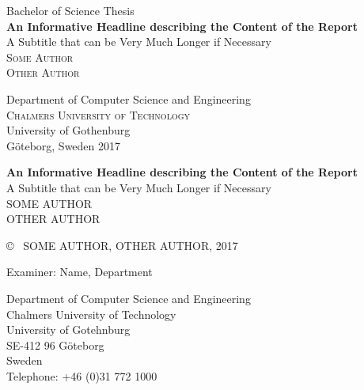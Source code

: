 \newpage
\setcounter{page}{1}
\thispagestyle{empty}
\begin{center}
	\large Bachelor of Science Thesis\\[4cm]		%
	\textbf{\large An Informative Headline describing the Content of the Report} \\[0.7cm]
	{\large A Subtitle that can be Very Much Longer if Necessary}\\[1cm]
	\textsc{{\large Some Author}}\\
	\textsc{{\large Other Author}}\
	
	\vfill	
	\begin{figure}[H]
	\centering
	\end{figure}	\vspace{5mm}	
	
	Department of Computer Science and Engineering \\
	\textsc{Chalmers University of Technology} \\
	University of Gothenburg \\[0.5cm]
	Göteborg, Sweden 2017 \\
\end{center}


\newpage
\thispagestyle{plain}
\textbf{An Informative Headline describing the Content of the Report}\\
A Subtitle that can be Very Much Longer if Necessary\\
SOME AUTHOR\\
OTHER AUTHOR\setlength{\parskip}{0.7cm}

\copyright ~ SOME AUTHOR, OTHER AUTHOR, 2017 \setlength{\parskip}{0.7cm}

Examiner: Name, Department \setlength{\parskip}{1cm}

Department of Computer Science and Engineering\\
Chalmers University of Technology\\
University of Gotehnburg\\
SE-412 96 Göteborg\\
Sweden\\
Telephone: +46 (0)31 772 1000 \setlength{\parskip}{0.5cm}

